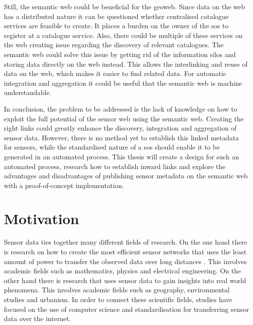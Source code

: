 Still, the semantic web could be beneficial for the geoweb. Since data on the web has a distributed nature it can be questioned whether centralised catalogue services are feasible to create. It places a burden on the owner of the \ac{sos} to register at a catalogue service. Also, there could be multiple of these services on the web creating issue regarding the discovery of relevant catalogues. The semantic web could solve this issue by getting rid of the information silos and storing data directly on the web instead. This allows the interlinking and reuse of data on the web, which makes it easier to find related data. For automatic integration and aggregation it could be useful that the semantic web is machine understandable. 

In conclusion, the problem to be addressed is the lack of knowledge on how to exploit the full potential of the sensor web using the semantic web. Creating the right links could greatly enhance the discovery, integration and aggregation of sensor data. However, there is no method yet to establish this linked metadata for sensors, while the standardised nature of a \ac{sos} should enable it to be generated in an automated process. This thesis will create a design for such an automated process, research how to establish inward links and explore the advantages and disadvantages of publishing sensor metadata on the semantic web with a proof-of-concept implementation. 

\section{Motivation}
Sensor data ties together many different fields of research. On the one hand there is research on how to create the most efficient sensor networks that uses the least amount of power to transfer the observed data over long distances \citep{SW:Korteweg,SW:Xiang}. This involves academic fields such as mathematics, physics and electrical engineering. On the other hand there is research that uses sensor data to gain insights into real world phenomena. This involves academic fields such as geography, environmental studies and urbanism. In order to connect these scientific fields, studies have focused on the use of computer science and standardisation for transferring sensor data over the internet. 

